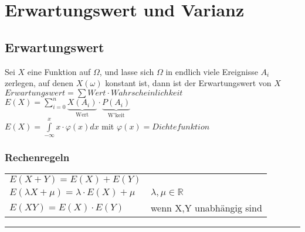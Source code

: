 \section{Erwartungswert und Varianz}

\subsection{Erwartungswert }
Sei $X$ eine Funktion auf $\Omega$, und lasse sich $\Omega$ in endlich viele
Ereignisse $A_i$ zerlegen, auf denen $X(\omega)$ konstant ist, dann ist der
Erwartungswert von $X$ \\
\hspace*{5.7cm}
$Erwartungswert = \sum Wert \cdot Wahrscheinlichkeit$ \\
\hspace*{7.5cm}
$E(X)=\sum\limits_{i=0}^n \underbrace{X(A_i)}_{\text{Wert}}\cdot
\underbrace{P(A_i)}_{\text{W'keit}}$ \\
\hspace*{5.7cm}
$E(X) = \int\limits_{-\infty}^x x \cdot \varphi(x) dx$ mit $\varphi(x) =
Dichtefunktion$

\subsubsection{Rechenregeln }
\begin{tabular}{ll}
  $E(X+Y)=E(X)+E(Y)$ \\
  $E(\lambda X + \mu) = \lambda \cdot E(X) + \mu$ & $\lambda, \mu \in
  \mathbb{R}$ \\
  $E(XY) = E(X)\cdot E(Y)$ & wenn X,Y unabhängig sind \\
\end{tabular}
\vspace{1mm} %
\hrule       %
\vspace{2mm} %

